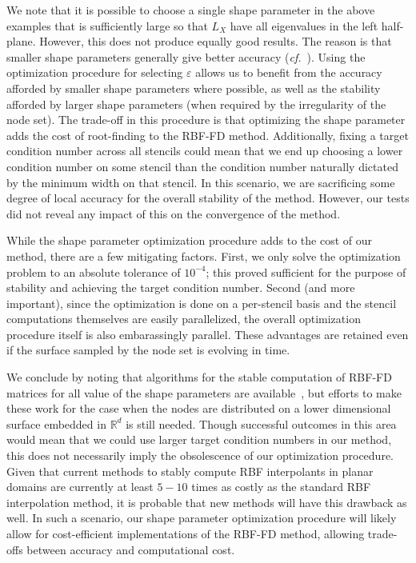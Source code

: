 \documentclass[smallextended]{svjour3}
\newcommand{\ep}{\varepsilon}
\begin{document}
We note that it is possible to choose a single shape parameter in the above examples that is sufficiently large so that $L_X$ have all eigenvalues in the left half-plane. However, this does not produce equally good results.  The reason is that smaller shape parameters generally give better accuracy (\emph{cf.}~\cite{Wright200699,LLHF}). Using the optimization procedure for selecting $\ep$ allows us to benefit from the accuracy afforded by smaller shape parameters where possible, as well as the stability afforded by larger shape parameters (when required by the irregularity of the node set). The trade-off in this procedure is that optimizing the shape parameter adds the cost of root-finding to the RBF-FD method. Additionally, fixing a target condition number across all stencils could mean that we end up choosing a lower condition number on some stencil than the condition number naturally dictated by the minimum width on that stencil. In this scenario, we are sacrificing some degree of local accuracy for the overall stability of the method. However, our tests did not reveal any impact of this on the convergence of the method.

While the shape parameter optimization procedure adds to the cost of our method, there are a few mitigating factors. First, we only solve the optimization problem to an absolute tolerance of $10^{-4}$; this proved sufficient for the purpose of stability and achieving the target condition number. Second (and more important), since the optimization is done on a per-stencil basis and the stencil computations themselves are easily parallelized, the overall optimization procedure itself is also embarassingly parallel. These advantages are retained even if the surface sampled by the node set is evolving in time.

We conclude by noting that algorithms for the stable computation of RBF-FD matrices for all value of the shape parameters are available~\cite{LLHF}, but efforts to make these work for the case when the nodes are distributed on a lower dimensional surface embedded in $\mathbb{R}^d$ is still needed. Though successful outcomes in this area would mean that we could use larger target condition numbers in our method, this does not necessarily imply the obsolescence of our optimization procedure. Given that current methods to stably compute RBF interpolants in planar domains are currently at least $5-10$ times as costly as the standard RBF interpolation method, it is probable that new methods will have this drawback as well. In such a scenario, our shape parameter optimization procedure will likely allow for cost-efficient implementations of the RBF-FD method, allowing trade-offs between accuracy and computational cost.
\end{document}
